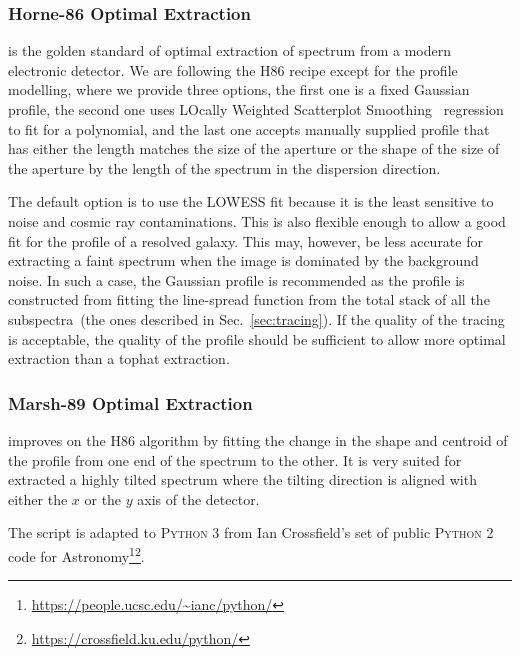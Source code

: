 \documentclass[fleqn,usenatbib]{mnras}
\begin{document}
\subsubsection*{Horne-86 Optimal Extraction}
\citet[hereafter H86]{1986PASP...98..609H} is the golden standard
of optimal extraction of spectrum from a modern electronic detector.
We are following the H86 recipe except for the profile modelling,
where we provide three options, the first one is a fixed Gaussian
profile, the second one uses LOcally Weighted Scatterplot
Smoothing~\citep[LOWESS]{doi:10.1080/01621459.1979.10481038}
regression to fit for a polynomial, and the last one accepts
manually supplied profile that has either the length matches the
size of the aperture or the shape of the size of the aperture by
the length of the spectrum in the dispersion direction.

The default option is to use the LOWESS fit because it is the
least sensitive to noise and cosmic ray contaminations. This is
also flexible enough to allow a good fit for the profile of a
resolved galaxy. This may, however, be less accurate for
extracting a faint spectrum when the image is dominated by the
background noise. In such a case, the Gaussian profile is
recommended as the profile is constructed from fitting the
line-spread function from the total stack of all the
subspectra~(the ones described in Sec.~\ref{sec:tracing}). If
the quality of the tracing is acceptable, the quality of the
profile should be sufficient to allow more optimal extraction
than a tophat extraction.

\subsubsection*{Marsh-89 Optimal Extraction}
\citet[hereafter M89]{1989PASP..101.1032M} improves on the H86
algorithm by fitting the change in the shape and centroid of
the profile from one end of the spectrum to the other. It is
very suited for extracted a highly tilted spectrum where the
tilting direction is aligned with either the $x$ or the $y$
axis of the detector.

The script is adapted to \textsc{Python 3} from Ian Crossfield's
set of public \textsc{Python 2} code for 
Astronomy\footnote{\url{https://people.ucsc.edu/~ianc/python/}}\footnote{\url{https://crossfield.ku.edu/python/}}.
\end{document}
